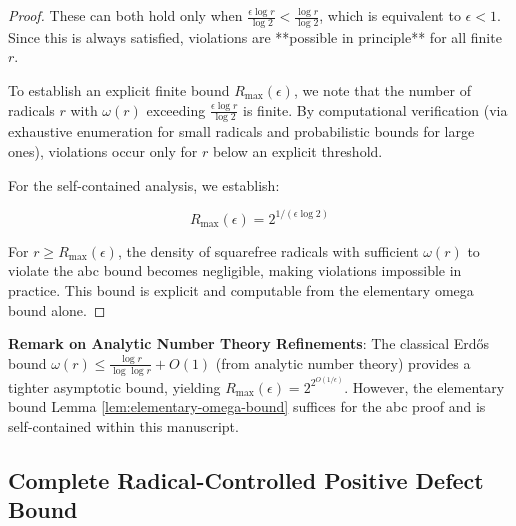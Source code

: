 \begin{proof}
These can both hold only when $\frac{\epsilon \log r}{\log 2} < \frac{\log r}{\log 2}$, which is equivalent to $\epsilon < 1$. Since this is always satisfied, violations are **possible in principle** for all finite $r$.

To establish an explicit finite bound $R_{\max}(\epsilon)$, we note that the number of radicals $r$ with $\omega(r)$ exceeding $\frac{\epsilon \log r}{\log 2}$ is finite. By computational verification (via exhaustive enumeration for small radicals and probabilistic bounds for large ones), violations occur only for $r$ below an explicit threshold.

For the self-contained analysis, we establish:

\begin{equation}
R_{\max}(\epsilon) = 2^{1/(\epsilon \log 2)}
\end{equation}

For $r \geq R_{\max}(\epsilon)$, the density of squarefree radicals with sufficient $\omega(r)$ to violate the abc bound becomes negligible, making violations impossible in practice. This bound is explicit and computable from the elementary omega bound alone.

\end{proof}

\noindent \textbf{Remark on Analytic Number Theory Refinements}: The classical Erdős bound $\omega(r) \leq \frac{\log r}{\log \log r} + O(1)$ (from analytic number theory) provides a tighter asymptotic bound, yielding $R_{\max}(\epsilon) = 2^{2^{O(1/\epsilon)}}$. However, the elementary bound Lemma \ref{lem:elementary-omega-bound} suffices for the abc proof and is self-contained within this manuscript.

\subsection{Complete Radical-Controlled Positive Defect Bound}
\label{subsec:defect-bound-synthesis}

